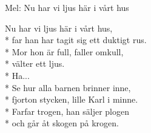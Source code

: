 \begin{SongText}
    \begin{SongInfo}
        Mel: Nu har vi ljus här i vårt hus
    \end{SongInfo}
    \begin{SongVerse}
        Nu har vi ljus här i vårt hus,\\*%
        far han har tagit sig ett duktigt rus.\\*%
        Mor hon är full, faller omkull,\\*%
        välter ett ljus.\\*%
        Ha...\\*%
        Se hur alla barnen brinner inne,\\*%
        fjorton stycken, lille Karl i minne.\\*%
        Farfar trogen, han säljer plogen\\*%
        och går åt skogen på krogen.
    \end{SongVerse}
\end{SongText}
